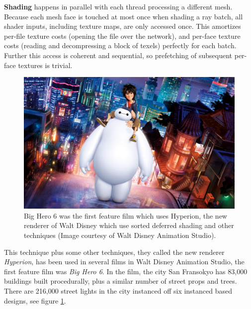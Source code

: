 \textbf{Shading} happens in parallel with each thread processing a different mesh. Because each mesh face is touched at most once when shading a ray batch, all shader inputs, including texture maps, are only accessed once. This amortizes per-file texture costs (opening the file over the network), and per-face texture costs (reading and decompressing a block of texels) perfectly for each batch. Further this access is coherent and sequential, so prefetching of subsequent per-face textures is trivial.

\begin{figure}\label{f:big-hero-6}
	\begin{center}
		\includegraphics[width=1.\textwidth]{graphics/gi/path-13}
	\end{center}
	\caption{Big Hero 6 was the first feature film which uses Hyperion, the new renderer of Walt Disney which use sorted deferred shading and other techniques (Image courtesy of Walt Disney Animation Studio).}
\end{figure}

This technique plus some other techniques, they called the new renderer \textit{Hyperion}, has been used in several films in Walt Disney Animation Studio, the first feature film was \textit{Big Hero 6}. In the film, the city San Fransokyo has 83,000 buildings built procedurally, plus a similar number of street props and trees. There are 216,000 street lights in the city instanced off six instanced based designs, see figure \ref{f:big-hero-6}.



